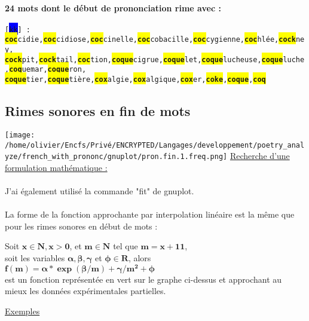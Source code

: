 \documentclass[french]{article}
\begin{document}
\paragraph{24 mots dont le début de prononciation rime avec :\\}
\texttt{[\colorbox{blue}{k{\textipa{\textopeno}}k}] : \colorbox{yellow}{\textbf{coc}}cidie,\colorbox{yellow}{\textbf{coc}}cidiose,\colorbox{yellow}{\textbf{coc}}cinelle,\colorbox{yellow}{\textbf{coc}}cobacille,\colorbox{yellow}{\textbf{coc}}cygienne,\colorbox{yellow}{\textbf{coc}}hlée,\colorbox{yellow}{\textbf{cock}}ney,}\\
\texttt{\colorbox{yellow}{\textbf{cock}}pit,\colorbox{yellow}{\textbf{cock}}tail,\colorbox{yellow}{\textbf{coc}}tion,\colorbox{yellow}{\textbf{coque}}cigrue,\colorbox{yellow}{\textbf{coque}}let,\colorbox{yellow}{\textbf{coque}}lucheuse,\colorbox{yellow}{\textbf{coque}}luche,\colorbox{yellow}{\textbf{coq}}uemar,\colorbox{yellow}{\textbf{coque}}ron,}\\
\texttt{\colorbox{yellow}{\textbf{coque}}tier,\colorbox{yellow}{\textbf{coque}}tière,\colorbox{yellow}{\textbf{cox}}algie,\colorbox{yellow}{\textbf{cox}}algique,\colorbox{yellow}{\textbf{cox}}er,\colorbox{yellow}{\textbf{coke}},\colorbox{yellow}{\textbf{coque}},\colorbox{yellow}{\textbf{coq}}}\\
\subsection{Rimes sonores en fin de mots}
\texttt{[image: /home/olivier/Encfs/Privé/ENCRYPTED/Langages/developpement/poetry\_analyze/french\_with\_prononc/gnuplot/pron.fin.1.freq.png]}
\underline{Recherche d'une formulation mathématique :}\\
\\
J'ai également utilisé la commande "fit" de gnuplot.\\
\\
La forme de la fonction approchante par interpolation linéaire est la même que pour les rimes sonores en début de mots :\\
\begin{center}
Soit $ \mathbf{x \in N, x > 0} $, et $ \mathbf{m \in N} $ tel que $ \mathbf{m = x + 11} $,\\
soit les variables $ \mathbf{\alpha, \beta, \gamma} $ et $ \mathbf{\phi \in R} $, alors\\
$ \mathbf{f(m) = \alpha * \exp(\beta/m) + \gamma / m^2 + \phi} $\\
est un fonction représentée en vert sur le graphe ci-dessus et approchant au mieux les données expérimentales partielles.\\
\end{center}
\underline{Exemples}
\end{document}
